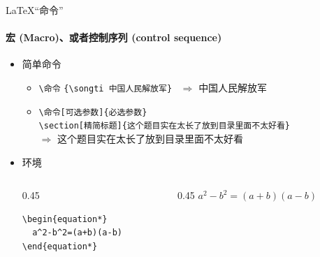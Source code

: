 \begin{frame}[fragile]{\LaTeX{}“命令”}
  \framesubtitle{宏 (Macro)、或者控制序列 (control sequence)}
  \begin{itemize}
    \item 简单命令
          \begin{itemize}
            \item \verb|\命令|\hspace{2em}
                  \verb|{\songti 中国人民解放军}| ~$\Rightarrow$ {\songti 中国人民解放军}
            \item \verb|\命令[可选参数]{必选参数}|\\
                  \verb|\section[精简标题]{这个题目实在太长了放到目录里面不太好看}|\\
                  $\Rightarrow$ { \hspace{1em} \songti
                    这个题目实在太长了放到目录里面不太好看}
          \end{itemize}
    \item 环境
          \begin{columns}[c]
            \begin{column}{0.45\textwidth}
              \begin{lstlisting}[basicstyle=\ttfamily]
\begin{equation*}
  a^2-b^2=(a+b)(a-b)
\end{equation*}
              \end{lstlisting}
            \end{column}\hspace{1em}
            \begin{column}{0.45\textwidth}
              $ a^2-b^2=(a+b)(a-b)$
            \end{column}
          \end{columns}
  \end{itemize}
\end{frame}

